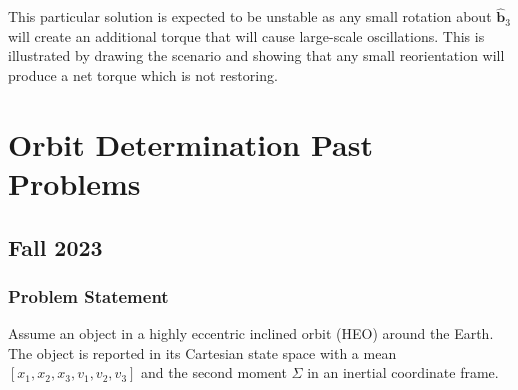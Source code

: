 \documentclass[
]{article}
\let\oldsection\section
\renewcommand\section{\clearpage\oldsection}
\begin{document}
This particular solution is expected to be unstable as any small
rotation about \(\hat{\boldsymbol{b}}_3\) will create an additional
torque that will cause large-scale oscillations. This is illustrated by
drawing the scenario and showing that any small reorientation will
produce a net torque which is not restoring.

\section{Orbit Determination Past
Problems}\label{orbit-determination-past-problems}

\subsection{Fall 2023}\label{fall-2023-2}

\subsubsection{Problem Statement}\label{problem-statement-6}

Assume an object in a highly eccentric inclined orbit (HEO) around the
Earth. The object is reported in its Cartesian state space with a mean
\([x_1,x_2,x_3,v_1,v_2,v_3]\) and the second moment \(\Sigma\) in an
inertial coordinate frame.
\end{document}
